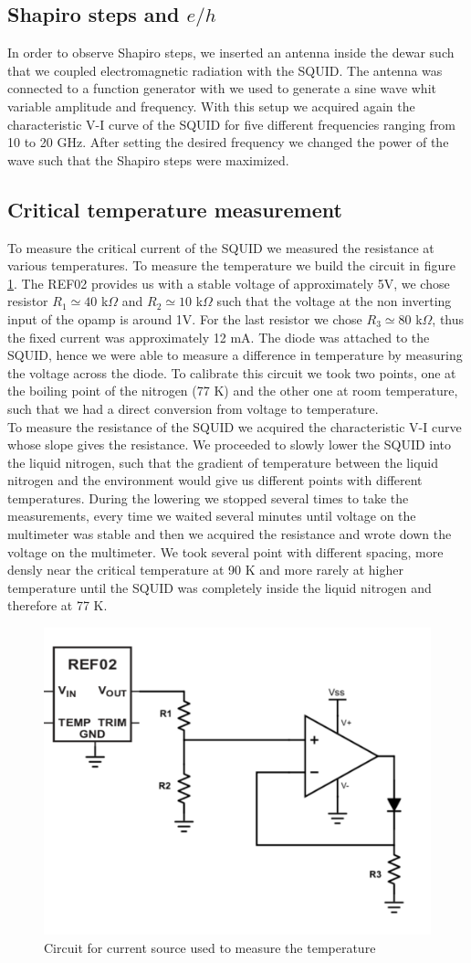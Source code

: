 \documentclass[a4paper,10pt]{article}
\begin{document}
\subsection{Shapiro steps and $e/h$}
In order to observe Shapiro steps, we inserted an antenna inside the dewar such that we coupled electromagnetic radiation with the SQUID. The antenna was connected to a function generator with we used to generate a sine wave whit variable amplitude and frequency. With this setup we acquired again the characteristic V-I curve of the SQUID for five different frequencies ranging from 10 to 20 GHz. After setting the desired frequency we changed the power of the wave such that the Shapiro steps were maximized.
\subsection{Critical temperature measurement}
To measure the critical current of the SQUID we measured the resistance at various temperatures. To measure the temperature we build the circuit in figure \ref{circuit}. The REF02 provides us with a stable voltage of approximately 5V, we chose resistor $R_1 \simeq 40$ k$\Omega$ and $R_2 \simeq 10$ k$\Omega$ such that the voltage at the non inverting input of the opamp is around 1V. For the last resistor  we chose $R_3 \simeq 80$ k$\Omega$, thus the fixed current was approximately 12 mA. The diode was attached to the SQUID, hence we were able to measure a difference in temperature by measuring the voltage across the diode. To calibrate this circuit we took two points, one at the boiling point of the nitrogen (77 K) and the other one at room temperature, such that we had a direct conversion from voltage to temperature.\\
To measure the resistance of the SQUID we acquired the characteristic V-I curve whose slope gives the resistance. We proceeded to slowly lower the SQUID into the liquid nitrogen, such that the gradient of temperature between the liquid nitrogen and the environment would give us different points with different temperatures. During the lowering we stopped several times to take the measurements, every time we waited several minutes until voltage on the multimeter was stable and then we acquired the resistance and wrote down the voltage on the multimeter.
We took several point with different spacing, more densly near the critical temperature at 90 K and more rarely at higher temperature until the SQUID was completely inside the liquid nitrogen and therefore at 77 K.
\begin{figure}[H]
\centering
\includegraphics[width = .5\textwidth]{circuit}
\caption{Circuit for current source used to measure the temperature}\label{circuit}
\end{figure}
\end{document}
